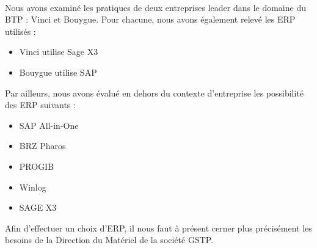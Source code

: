\hfill\\

Nous avons examiné les pratiques de deux entreprises leader dans le domaine
du BTP : Vinci et Bouygue. Pour chacune, nous avons également relevé les
ERP utilisés :

\begin{itemize}
\item Vinci utilise Sage X3
\item Bouygue utilise SAP
\end{itemize}

\vskip 6pt

Par ailleurs, nous avons évalué en dehors du contexte d'entreprise les possibilité des ERP suivants :

\begin{itemize}
\item SAP All-in-One
\item BRZ Pharos
\item PROGIB
\item Winlog
\item SAGE X3
\end{itemize}

\vskip 6pt

Afin d'effectuer un choix d'ERP, il nous faut à présent cerner plus
précisément les besoins de la Direction du Matériel de la société GSTP.

